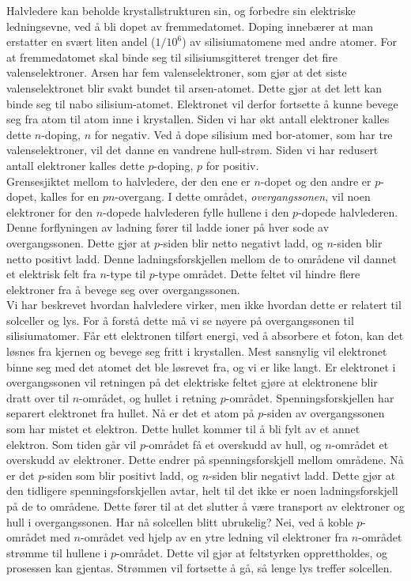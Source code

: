 \documentclass[%
 reprint,
 amsmath,amssymb,
 aps,
 norsk,
 booktabs
]{revtex4-1}
\begin{document}
Halvledere kan beholde krystallstrukturen sin, og forbedre sin elektriske ledningsevne, ved å bli dopet av fremmedatomet. Doping innebærer at man erstatter en svært liten andel ($1/10^6$) av silisiumatomene med andre atomer. For at fremmedatomet skal binde seg til silisiumsgitteret trenger det fire valenselektroner. Arsen har fem valenselektroner, som gjør at det siste valenselektronet blir svakt bundet til arsen-atomet. Dette gjør at det lett kan binde seg til nabo silisium-atomet. Elektronet vil derfor fortsette å kunne bevege seg fra atom til atom inne i krystallen. Siden vi har økt antall elektroner kalles dette $n$-doping, $n$ for negativ. Ved å dope silisium med bor-atomer, som har tre valenselektroner, vil det danne en vandrene hull-strøm. Siden vi har redusert antall elektroner kalles dette $p$-doping, $p$ for positiv.\\
Grensesjiktet mellom to halvledere, der den ene er $n$-dopet og den andre er $p$-dopet, kalles for en $pn$-overgang. I dette området, \textit{overgangssonen}, vil noen elektroner for den $n$-dopede halvlederen fylle hullene i den $p$-dopede halvlederen. Denne forflyningen av ladning fører til ladde ioner på hver sode av overgangssonen. Dette gjør at $p$-siden blir netto negativt ladd, og $n$-siden blir netto positivt ladd. Denne ladningsforskjellen mellom de to områdene vil dannet et elektrisk felt fra $n$-type til $p$-type området. Dette feltet vil hindre flere elektroner fra å bevege seg over overgangssonen.\\
Vi har beskrevet hvordan halvledere virker, men ikke hvordan dette er relatert til solceller og lys. For å  forstå dette må vi se nøyere på overgangssonen til silisiumatomer.
Får ett elektronen tilført energi, ved å absorbere et foton, kan det løsnes fra kjernen og bevege seg fritt i krystallen. Mest sansnylig vil elektronet binne seg med det atomet det ble løsrevet fra, og vi er like langt. Er elektronet i overgangssonen vil retningen på det elektriske feltet gjøre at elektronene blir dratt over til $n$-området, og hullet i retning $p$-området. Spenningsforskjellen har separert elektronet fra hullet. Nå er det et atom på $p$-siden av overgangssonen som har mistet et elektron. Dette hullet kommer til å bli fylt av et annet elektron. Som tiden går vil $p$-området få et overskudd av hull, og $n$-området et overskudd av elektroner. Dette endrer på spenningsforskjell mellom områdene. Nå er det $p$-siden som blir positivt ladd, og $n$-siden blir negativt ladd. Dette gjør at den tidligere spenningsforskjellen avtar, helt til det ikke er noen ladningsforskjell på de to områdene. Dette fører til at det slutter å være transport av elektroner og hull i overgangssonen. Har nå solcellen blitt ubrukelig? Nei, ved å koble $p$-området med $n$-området ved hjelp av en ytre ledning vil elektroner fra $n$-området strømme til hullene i $p$-området. Dette vil gjør at feltstyrken opprettholdes, og prosessen kan gjentas. Strømmen vil fortsette å gå, så lenge lys treffer solcellen.\par
\end{document}
